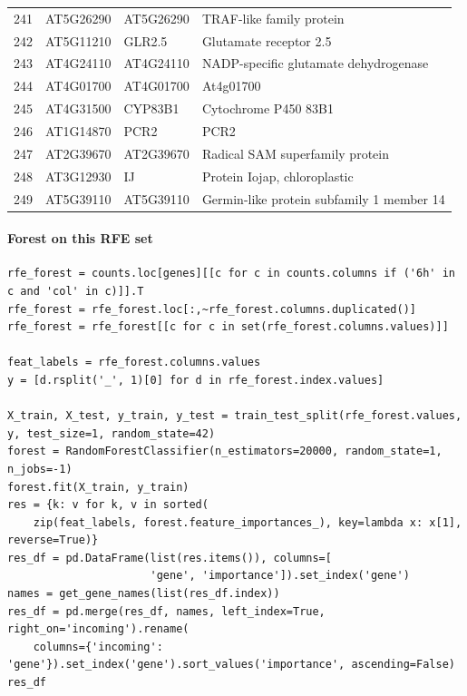 \documentclass[11pt]{article}
\begin{document}
\begin{center}
\begin{tabular}{rlll}
241 & AT5G26290 & AT5G26290 & TRAF-like family protein\\
242 & AT5G11210 & GLR2.5 & Glutamate receptor 2.5\\
243 & AT4G24110 & AT4G24110 & NADP-specific glutamate dehydrogenase\\
244 & AT4G01700 & AT4G01700 & At4g01700\\
245 & AT4G31500 & CYP83B1 & Cytochrome P450 83B1\\
246 & AT1G14870 & PCR2 & PCR2\\
247 & AT2G39670 & AT2G39670 & Radical SAM superfamily protein\\
248 & AT3G12930 & IJ & Protein Iojap, chloroplastic\\
249 & AT5G39110 & AT5G39110 & Germin-like protein subfamily 1 member 14\\
\end{tabular}
\end{center}


\paragraph{Forest on this RFE set}
\label{sec:org44d5e63}

\begin{verbatim}
rfe_forest = counts.loc[genes][[c for c in counts.columns if ('6h' in c and 'col' in c)]].T
rfe_forest = rfe_forest.loc[:,~rfe_forest.columns.duplicated()]
rfe_forest = rfe_forest[[c for c in set(rfe_forest.columns.values)]]

feat_labels = rfe_forest.columns.values
y = [d.rsplit('_', 1)[0] for d in rfe_forest.index.values]

X_train, X_test, y_train, y_test = train_test_split(rfe_forest.values, y, test_size=1, random_state=42)
forest = RandomForestClassifier(n_estimators=20000, random_state=1, n_jobs=-1)
forest.fit(X_train, y_train)
res = {k: v for k, v in sorted(
    zip(feat_labels, forest.feature_importances_), key=lambda x: x[1], reverse=True)}
res_df = pd.DataFrame(list(res.items()), columns=[
                      'gene', 'importance']).set_index('gene')
names = get_gene_names(list(res_df.index))
res_df = pd.merge(res_df, names, left_index=True, right_on='incoming').rename(
    columns={'incoming': 'gene'}).set_index('gene').sort_values('importance', ascending=False)
res_df
\end{verbatim}
\end{document}
